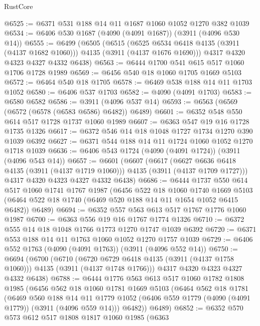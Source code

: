 \begin{lexlean}{RustCore}
\begin{coremodule}
@6525 := @6371 @531 @188 @14 @11 @1687 @1060 @1052 @1270 @382 @1039
@6534 := @6406 @530 @1687 (@4090 (@4091 @1687)) (@3911 (@4096 @530 @14))
@6555 := @6499
    (@6505
      (@6515
        (@6525 @6534 @6418 @4135 (@3911 (@4137 @1682 @1060)))
        @4135
        (@3911 (@4137 @1676 @1690)))
      @4317
      @4320
      @4323
      @4327
      @4332
      @6438)
@6563 := @6444 @1700 @541 @615 @517 @1060 @1706 @1728 @1989
@6569 := @6456 @540 @18 @1060 @1705 @1669 @5103
@6572 := @6464 @540 @18 @1705
@6578 := @6469 @538 @188 @14 @11 @1703 @1052
@6580 := @6406 @537 @1703
@6582 := @4090 (@4091 @1703)
@6583 := @6580 @6582
@6586 := @3911 (@4096 @537 @14)
@6593 := @6563 (@6569 (@6572 (@6578 (@6583 @6586) @6482)) @6489)
@6601 := @6352 @548 @550 @614 @517 @1728 @1737 @1060 @1989
@6607 := @6363 @547 @19 @16 @1728 @1735 @1326
@6617 := @6372 @546 @14 @18 @1048 @1727 @1734 @1270 @390 @1039 @6392
@6627 := @6371 @544 @188 @14 @11 @1724 @1060 @1052 @1270 @1718 @1039
@6636 := @6406 @543 @1724 (@4090 (@4091 @1724)) (@3911 (@4096 @543 @14))
@6657 := @6601
    (@6607
      (@6617
        (@6627 @6636 @6418 @4135 (@3911 (@4137 @1719 @1060)))
        @4135
        (@3911 (@4137 @1709 @1727)))
      @4317
      @4320
      @4323
      @4327
      @4332
      @6438)
@6686 := @6444
    @1737
    @550
    @614
    @517
    @1060
    @1741
    @1767
    @1987
    (@6456
      @522
      @18
      @1060
      @1740
      @1669
      @5103
      (@6464 @522 @18 @1740 (@6469 @520 @188 @14 @11 @1654 @1052 @6415 @6482))
      @6489)
@6694 := @6352 @557 @563 @613 @517 @1767 @1776 @1060 @1987
@6700 := @6363 @556 @19 @16 @1767 @1774 @1326
@6710 := @6372 @555 @14 @18 @1048 @1766 @1773 @1270 @1747 @1039 @6392
@6720 := @6371 @553 @188 @14 @11 @1763 @1060 @1052 @1270 @1757 @1039
@6729 := @6406 @552 @1763 (@4090 (@4091 @1763)) (@3911 (@4096 @552 @14))
@6750 := @6694
    (@6700
      (@6710
        (@6720 @6729 @6418 @4135 (@3911 (@4137 @1758 @1060)))
        @4135
        (@3911 (@4137 @1748 @1766)))
      @4317
      @4320
      @4323
      @4327
      @4332
      @6438)
@6788 := @6444
    @1776
    @563
    @613
    @517
    @1060
    @1782
    @1808
    @1985
    (@6456
      @562
      @18
      @1060
      @1781
      @1669
      @5103
      (@6464
        @562
        @18
        @1781
        (@6469
          @560
          @188
          @14
          @11
          @1779
          @1052
          (@6406 @559 @1779 (@4090 (@4091 @1779)) (@3911 (@4096 @559 @14)))
          @6482))
      @6489)
@6852 := @6352
    @570
    @573
    @612
    @517
    @1808
    @1817
    @1060
    @1985
    (@6363

\end{coremodule}
\end{lexlean}
